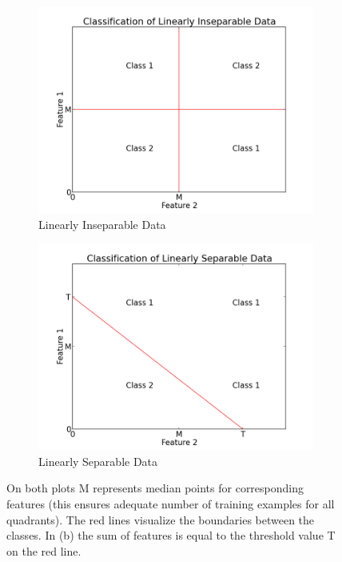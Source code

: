 \documentclass[12pt,notitlepage,twoside]{scrbook}
\begin{document}
\begin{figure}[h]
\begin{subfigure}[b]{0.45\linewidth}
  \includegraphics[width=\linewidth]{figs/gen_insep.png}
  \caption{Linearly Inseparable Data \label{sf:insep}}
\end{subfigure}
\begin{subfigure}[b]{0.45\linewidth}
  \includegraphics[width=1\linewidth]{figs/gen_sep.png}
  \caption{Linearly Separable Data \label{sf:sep}}
\end{subfigure}
\caption{On both plots M represents median points for corresponding features (this ensures
	adequate number of training examples for all quadrants).  The red lines visualize
	the boundaries between the classes.  In (b) the sum of features is equal to the
	threshold value T on the red line.\label{fig:example_probs}}
\end{figure}
\end{document}
